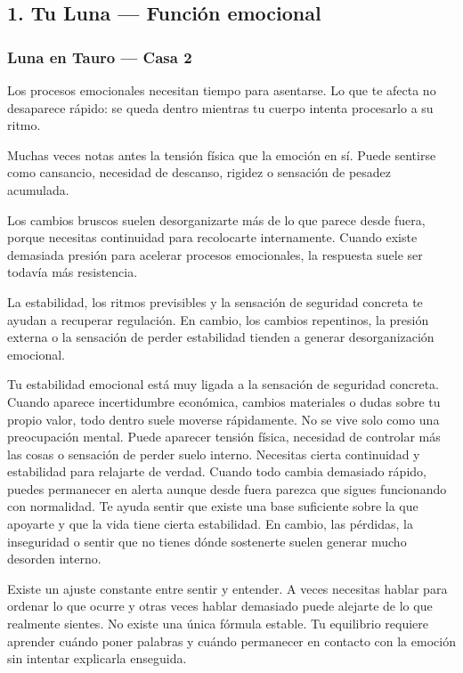 \documentclass[11pt,a4paper]{article}
\begin{document}
\subsection{1. Tu Luna — Función emocional}

\subsubsection*{Luna en Tauro — Casa 2}

Los procesos emocionales necesitan tiempo para asentarse. Lo que te afecta no desaparece rápido: se queda dentro mientras tu cuerpo intenta procesarlo a su ritmo.

Muchas veces notas antes la tensión física que la emoción en sí. Puede sentirse como cansancio, necesidad de descanso, rigidez o sensación de pesadez acumulada.

Los cambios bruscos suelen desorganizarte más de lo que parece desde fuera, porque necesitas continuidad para recolocarte internamente. Cuando existe demasiada presión para acelerar procesos emocionales, la respuesta suele ser todavía más resistencia.

La estabilidad, los ritmos previsibles y la sensación de seguridad concreta te ayudan a recuperar regulación. En cambio, los cambios repentinos, la presión externa o la sensación de perder estabilidad tienden a generar desorganización emocional.

Tu estabilidad emocional está muy ligada a la sensación de seguridad concreta. Cuando aparece incertidumbre económica, cambios materiales o dudas sobre tu propio valor, todo dentro suele moverse rápidamente. No se vive solo como una preocupación mental. Puede aparecer tensión física, necesidad de controlar más las cosas o sensación de perder suelo interno. Necesitas cierta continuidad y estabilidad para relajarte de verdad. Cuando todo cambia demasiado rápido, puedes permanecer en alerta aunque desde fuera parezca que sigues funcionando con normalidad. Te ayuda sentir que existe una base suficiente sobre la que apoyarte y que la vida tiene cierta estabilidad. En cambio, las pérdidas, la inseguridad o sentir que no tienes dónde sostenerte suelen generar mucho desorden interno.

Existe un ajuste constante entre sentir y entender. A veces necesitas hablar para ordenar lo que ocurre y otras veces hablar demasiado puede alejarte de lo que realmente sientes. No existe una única fórmula estable. Tu equilibrio requiere aprender cuándo poner palabras y cuándo permanecer en contacto con la emoción sin intentar explicarla enseguida.
\end{document}
